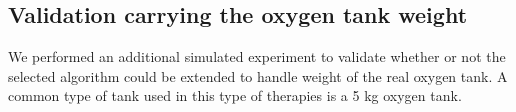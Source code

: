 \documentclass[journal]{IEEEtran}
\begin{document}
\subsection{Validation carrying the oxygen tank weight}

We performed an additional simulated experiment to validate whether or not the selected algorithm could be extended to handle weight of the real oxygen tank. A common type of tank used in this type of therapies is a 5 kg oxygen tank.

\begin{figure} 
    \centering
  \\
    \hspace*{-1.5em}
    \vspace*{-1.1em}

\end{figure}
\end{document}
